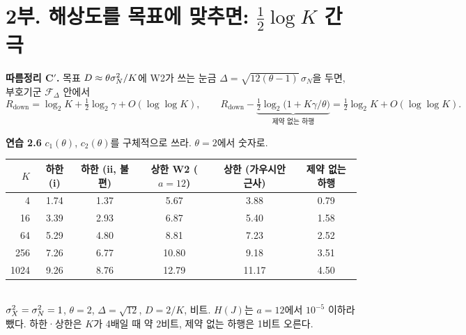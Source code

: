 
\section*{2부. 해상도를 목표에 맞추면: $\tfrac12\log K$ 간극}
\textbf{따름정리 C$'$.} 목표 $D\approx\theta\sigma_N^2/K$에 W2가 쓰는 눈금 $\Delta=\sqrt{12(\theta-1)}\,\sigma_N$을 두면, 부호기군 $\mathcal F_\Delta$ 안에서
\[
R_{\mathrm{down}}=\log_2K+\tfrac12\log_2\gamma+O(\log\log K),
\qquad
R_{\mathrm{down}}-\underbrace{\tfrac12\log_2\!\big(1+K\gamma/\theta\big)}_{\text{제약 없는 하행}}=\tfrac12\log_2K+O(\log\log K).
\]


\textbf{연습 2.6} $c_1(\theta)$, $c_2(\theta)$를 구체적으로 쓰라. $\theta=2$에서 숫자로. \vspace{3em}

\begin{center}\small
\renewcommand{\arraystretch}{1.3}
\begin{tabular}{rccccc}
\toprule
$K$ & 하한 (i) & 하한 (ii, 불편) & 상한 W2 ($a=12$) & 상한 (가우시안 근사) & 제약 없는 하행\\ \midrule
4 & 1.74 & 1.37 & 5.67 & 3.88 & 0.79\\
16 & 3.39 & 2.93 & 6.87 & 5.40 & 1.58\\
64 & 5.29 & 4.80 & 8.81 & 7.23 & 2.52\\
256 & 7.26 & 6.77 & 10.80 & 9.18 & 3.51\\
1024 & 9.26 & 8.76 & 12.79 & 11.17 & 4.50\\
\bottomrule
\end{tabular}\\[2pt]
$\sigma_X^2=\sigma_N^2=1$, $\theta=2$, $\Delta=\sqrt{12}$, $D=2/K$, 비트. $H(J)$는 $a=12$에서 $10^{-5}$ 이하라 뺐다. 하한·상한은 $K$가 4배일 때 약 2비트, 제약 없는 하행은 1비트 오른다.
\end{center}

